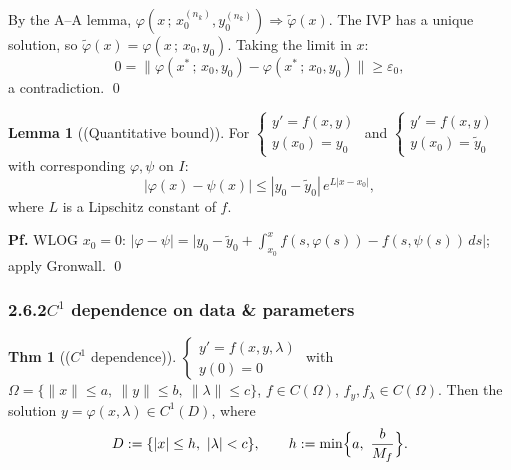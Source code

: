 \documentclass[11pt]{article}
\theoremstyle{definition}
\newtheorem*{theorem}{Thm}
\newtheorem*{lemma}{Lemma}
\theoremstyle{remark}
\newcommand{\subsecn}[1]{\subsubsection*{#1}}
\begin{document}
By the A--A lemma, $\varphi(x\,;\, x_0^{(n_k)}, y_0^{(n_k)}) \Rightarrow \widetilde{\varphi}(x)$.
The IVP has a unique solution, so $\widetilde{\varphi}(x) = \varphi(x\,;\, x_0, y_0)$. Taking the
limit in $x$:
\[
0 = \bigl\| \varphi(x^*\,;\, x_0, y_0) - \varphi(x^*\,;\, x_0, y_0) \bigr\| \ge \varepsilon_0,
\]
a contradiction. \qed

\begin{lemma}[(Quantitative bound)]
For $\begin{cases} y' = f(x,y) \\ y(x_0) = y_0 \end{cases}$ and
$\begin{cases} y' = f(x,y) \\ y(x_0) = \tilde{y}_0 \end{cases}$ with corresponding $\varphi, \psi$ on $I$:
\[
| \varphi(x) - \psi(x) | \le | y_0 - \tilde{y}_0 |\, e^{L|x - x_0|},
\]
where $L$ is a Lipschitz constant of $f$.

\textbf{Pf.} WLOG $x_0 = 0$:
$| \varphi - \psi | = \bigl| y_0 - \tilde{y}_0 + \int_{x_0}^x f(s, \varphi(s)) - f(s, \psi(s))\, ds \bigr|$;
apply Gronwall. \qed
\end{lemma}

\subsecn{2.6.2\quad $C^1$ dependence on data \& parameters}

\begin{theorem}[($C^1$ dependence)]
$\begin{cases} y' = f(x,y,\lambda) \\ y(0) = 0 \end{cases}$ with
$\Omega = \{ \|x\| \le a,\ \|y\| \le b,\ \|\lambda\| \le c \}$, $f \in C(\Omega)$,
$f_y, f_\lambda \in C(\Omega)$. Then the solution $y = \varphi(x, \lambda) \in C^1(D)$, where
\[
D := \{ |x| \le h,\ |\lambda| < c \}, \qquad h := \min \Bigl\{ a,\ \frac{b}{M_f} \Bigr\}.
\]
\end{theorem}
\end{document}
